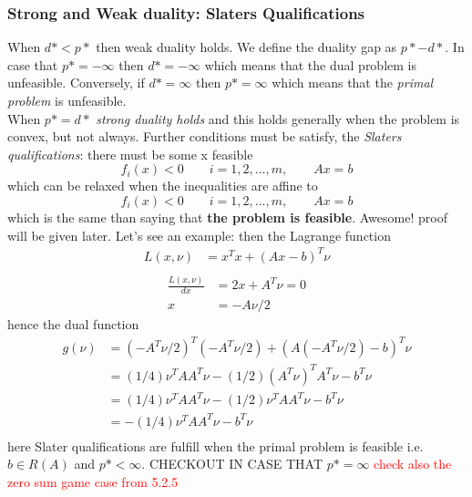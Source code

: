 \subsubsection{Strong and Weak duality: Slaters Qualifications}
When $d*<p*$ then weak duality holds. We define the duality gap as $p*-d*$. In case that $p*=-\infty$ then $d*=-\infty$ which means that the dual problem is unfeasible. Conversely, if $d*=\infty$ then $p*=\infty$ which means that the \textit{primal problem} is unfeasible.\\
When $p*=d*$ \textit{strong duality holds} and this holds generally when the problem is convex, but not always. Further conditions must be satisfy, the \textit{Slaters qualifications}: there must be some x  feasible
\begin{equation}
f_i(x) < 0 \qquad i = 1,2,...,m, \qquad Ax = b
\end{equation}
which can be relaxed when the inequalities are affine to
\begin{equation}
f_i(x) < 0 \qquad i = 1,2,...,m, \qquad Ax = b
\end{equation}
which is the same than saying that \textbf{the problem is feasible}. Awesome! proof will be given later. Let's see an example:
then the Lagrange function 
\begin{equation*}\begin{aligned}
L(x,\nu)&=x^Tx +(Ax-b)^T\nu\\
\end{aligned}\end{equation*}
\begin{equation*}\begin{aligned}
\frac{L(x,\nu)}{dx} &= 2x + A^T\nu = 0\\
x &= -A\nu/2
\end{aligned}\end{equation*}
hence the dual function
\begin{equation*}
\begin{aligned}
g(\nu) &= (-A^T\nu/2)^T(-A^T\nu/2) + (A(-A^T\nu/2) - b)^T\nu\\
&=(1/4)\nu^TAA^T\nu - (1/2)(A^T\nu)^TA^T\nu -b^T\nu \\
&=(1/4)\nu^TAA^T\nu - (1/2)\nu^TAA^T\nu -b^T\nu \\
&=-(1/4)\nu^TAA^T\nu -b^T\nu \\
\end{aligned}
\end{equation*}
here Slater qualifications are fulfill when the primal problem is feasible i.e. $b\in R(A)$ and $p*<\infty$. CHECKOUT IN CASE THAT $p*=\infty$
\textcolor{red}{check also the zero sum game case from 5.2.5}

